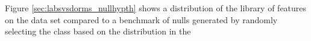 Figure \ref{sec:labsvsdorms_nullhypth} shows a distribution of the library of features on the data set compared to a benchmark of nulls generated by randomly selecting the class based on the distribution in the 